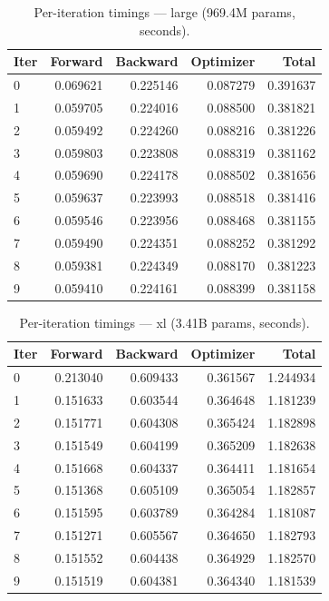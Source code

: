 \documentclass[11pt]{article}
\begin{document}
\begin{table}[H]
\centering
\caption{Per-iteration timings --- large (969.4M params, seconds).}
\label{tab:bench-large}
\begin{tabular}{lrrrr}
  \toprule
  Iter & Forward & Backward & Optimizer & Total \\
  \midrule
  0 & 0.069621 & 0.225146 & 0.087279 & 0.391637 \\
  1 & 0.059705 & 0.224016 & 0.088500 & 0.381821 \\
  2 & 0.059492 & 0.224260 & 0.088216 & 0.381226 \\
  3 & 0.059803 & 0.223808 & 0.088319 & 0.381162 \\
  4 & 0.059690 & 0.224178 & 0.088502 & 0.381656 \\
  5 & 0.059637 & 0.223993 & 0.088518 & 0.381416 \\
  6 & 0.059546 & 0.223956 & 0.088468 & 0.381155 \\
  7 & 0.059490 & 0.224351 & 0.088252 & 0.381292 \\
  8 & 0.059381 & 0.224349 & 0.088170 & 0.381223 \\
  9 & 0.059410 & 0.224161 & 0.088399 & 0.381158 \\
  \bottomrule
\end{tabular}
\end{table}

\begin{table}[H]
\centering
\caption{Per-iteration timings --- xl (3.41B params, seconds).}
\label{tab:bench-xl}
\begin{tabular}{lrrrr}
  \toprule
  Iter & Forward & Backward & Optimizer & Total \\
  \midrule
  0 & 0.213040 & 0.609433 & 0.361567 & 1.244934 \\
  1 & 0.151633 & 0.603544 & 0.364648 & 1.181239 \\
  2 & 0.151771 & 0.604308 & 0.365424 & 1.182898 \\
  3 & 0.151549 & 0.604199 & 0.365209 & 1.182638 \\
  4 & 0.151668 & 0.604337 & 0.364411 & 1.181654 \\
  5 & 0.151368 & 0.605109 & 0.365054 & 1.182857 \\
  6 & 0.151595 & 0.603789 & 0.364284 & 1.181087 \\
  7 & 0.151271 & 0.605567 & 0.364650 & 1.182793 \\
  8 & 0.151552 & 0.604438 & 0.364929 & 1.182570 \\
  9 & 0.151519 & 0.604381 & 0.364340 & 1.181539 \\
  \bottomrule
\end{tabular}
\end{table}
\end{document}
